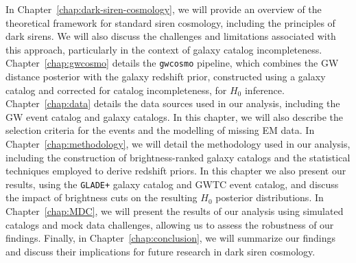 In Chapter~\ref{chap:dark-siren-cosmology}, we will provide an overview of the theoretical framework for standard siren cosmology, including the principles of dark sirens. We will also discuss the challenges and limitations associated with this approach, particularly in the context of galaxy catalog incompleteness. Chapter~\ref{chap:gwcosmo} details the \texttt{gwcosmo} pipeline, which combines the \ac{GW} distance posterior with the galaxy redshift prior, constructed using a galaxy catalog and corrected for catalog incompleteness, for $H_0$ inference. Chapter~\ref{chap:data} details the data sources used in our analysis, including the \ac{GW} event catalog and galaxy catalogs. In this chapter, we will also describe the selection criteria for the events and the modelling of missing \ac{EM} data. In Chapter~\ref{chap:methodology}, we will detail the methodology used in our analysis, including the construction of brightness-ranked galaxy catalogs and the statistical techniques employed to derive redshift priors. In this chapter we also present our results, using the \texttt{GLADE+} galaxy catalog and \acs{GWTC} event catalog, and discuss the impact of brightness cuts on the resulting $H_0$ posterior distributions. In Chapter~\ref{chap:MDC}, we will present the results of our analysis using simulated catalogs and mock data challenges, allowing us to assess the robustness of our findings. Finally, in Chapter~\ref{chap:conclusion}, we will summarize our findings and discuss their implications for future research in dark siren cosmology.
